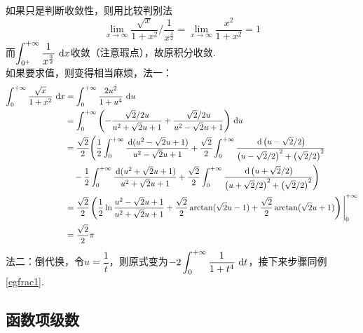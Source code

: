 \begin{analysis}
如果只是判断收敛性，则用比较判别法
\[\lim_{x\to\infty}\dfrac{\sqrt{x}}{1+x^2}\Big/\dfrac{1}{x^{\frac{3}{2}}}=\lim_{x\to\infty}\dfrac{x^2}{1+x^2}=1\]
而$\displaystyle\int_{0^+}^{+\infty}{\dfrac{1}{x^{\frac{3}{2}}}}\,\,\mathrm{d} x$收敛（注意瑕点），故原积分收敛.\\
如果要求值，则变得相当麻烦，法一：
\[\begin{aligned}
  \displaystyle\int_{0}^{+\infty}{\dfrac{\sqrt{x}}{1+x^2}}\,\,\mathrm{d} x
  &=\displaystyle\int_{0}^{+\infty}{\dfrac{2u^2}{1+u^4}}\,\,\mathrm{d} u\\
  &=\displaystyle\int_{0}^{+\infty}{\left(-\dfrac{\sqrt{2}/2u}{u^2+\sqrt{2}u+1}+\dfrac{\sqrt{2}/2u}{u^2-\sqrt{2}u+1}\right)}\,\,\mathrm{d} u\\
  &=\dfrac{\sqrt{2}}{2}\Bigg(\dfrac{1}{2}\int_0^{+\infty}\dfrac{\,\mathrm{d}(u^2-\sqrt{2}u+1)}{u^2-\sqrt{2}u+1}+\dfrac{\sqrt{2}}{2}\int_0^{+\infty}\dfrac{\,\mathrm{d}\left(u-\sqrt{2}/{2}\right)}{\left(u-\sqrt{2}/{2}\right)^2+\left(\sqrt{2}/{2}\right)^2}\\
  &\quad-\dfrac{1}{2}\int_0^{+\infty}\dfrac{\,\mathrm{d}(u^2+\sqrt{2}u+1)}{u^2+\sqrt{2}u+1}+\dfrac{\sqrt{2}}{2}\int_0^{+\infty}\dfrac{\,\mathrm{d}\left(u+\sqrt{2}/{2}\right)}{\left(u+\sqrt{2}/{2}\right)^2+\left(\sqrt{2}/{2}\right)^2}\Bigg)\\
  &=\dfrac{\sqrt{2}}{2}\left(\dfrac{1}{2}\ln\dfrac{u^2-\sqrt{2}u+1}{u^2+\sqrt{2}u+1}+\dfrac{\sqrt{2}}{2}\arctan(\sqrt{2}u-1)+\dfrac{\sqrt{2}}{2}\arctan(\sqrt{2}u+1)\right)\Bigg|_0^{+\infty}\\
  &=\dfrac{\sqrt{2}}{2}\pi                   
\end{aligned}\]
法二：倒代换，令$u=\dfrac{1}{t}$，则原式变为$\displaystyle -2\displaystyle\int_{0}^{+\infty}{\dfrac{1}{1+t^4}}\,\,\mathrm{d} t$，接下来步骤同例\ref{egfrac1}.
\end{analysis}

\subsection{函数项级数}
